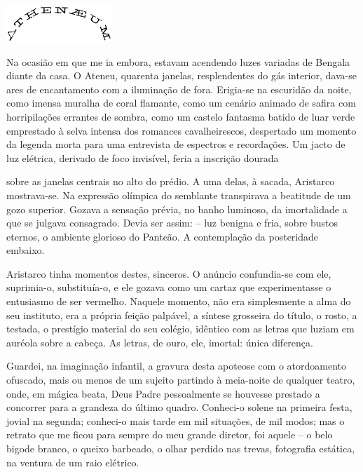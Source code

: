 \begin{center}\includegraphics[width=4cm]{3.png}\end{center}

Na ocasião em que me ia embora,
estavam acendendo luzes variadas de Bengala diante da casa. O Ateneu,
quarenta janelas, resplendentes do gás interior, dava{}-se ares de
encantamento com a iluminação de fora. Erigia{}-se na escuridão da
noite, como imensa muralha de coral flamante, como um cenário animado
de safira com horripilações errantes de sombra, como um castelo
fantasma batido de luar verde emprestado à selva intensa dos romances
cavalheirescos, despertado um momento da legenda morta para uma
entrevista de espectros e recordações. Um jacto de luz elétrica,
derivado de foco invisível, feria a inscrição dourada


\noindent sobre as janelas centrais no alto do prédio. A uma delas, à sacada,
Aristarco mostrava{}-se. Na expressão olímpica do semblante transpirava
a beatitude de um gozo superior. Gozava a sensação prévia, no banho
luminoso, da imortalidade a que se julgava consagrado. Devia ser assim:
-- luz benigna e fria, sobre bustos eternos, o ambiente glorioso do Panteão. A
contemplação da posteridade embaixo. 

Aristarco tinha momentos destes,
sinceros. O anúncio confundia{}-se com ele, suprimia{}-o, substituía{}-o,
e ele gozava como um cartaz que experimentasse o entusiasmo de ser
vermelho. Naquele momento, não era simplesmente a alma do seu
instituto, era a própria feição palpável, a síntese grosseira do
título, o rosto, a testada, o prestígio material do seu colégio,
idêntico com as letras que luziam em auréola sobre a cabeça. As letras,
de ouro, ele, imortal: única diferença. 


Guardei, na imaginação
infantil, a gravura desta apoteose com o atordoamento ofuscado, mais ou
menos de um sujeito partindo à meia{}-noite de qualquer teatro, onde,
em mágica beata, Deus Padre pessoalmente se houvesse prestado a
concorrer para a grandeza do último quadro. Conheci{}-o solene na
primeira festa, jovial na segunda; conheci{}-o mais tarde em mil
situações, de mil modos; mas o retrato que me ficou para sempre do meu
grande diretor, foi aquele -- o belo bigode branco, o queixo barbeado,
o olhar perdido nas trevas, fotografia estática, na ventura de um raio
elétrico. 

